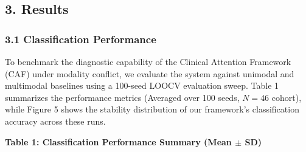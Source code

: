 \documentclass[
]{article}
\begin{document}
\subsection{\texorpdfstring{\textbf{3.
Results}}{3. Results}}\label{results}

\subsubsection{\texorpdfstring{\textbf{3.1 Classification
Performance}}{3.1 Classification Performance}}\label{classification-performance}

To benchmark the diagnostic capability of the Clinical Attention
Framework (CAF) under modality conflict, we evaluate the system against
unimodal and multimodal baselines using a 100-seed LOOCV evaluation
sweep. Table 1 summarizes the performance metrics (Averaged over 100
seeds, \(N = 46\) cohort), while Figure 5 shows the stability
distribution of our framework's classification accuracy across these
runs.

\textbf{Table 1: Classification Performance Summary (Mean \(\pm\) SD)}
\end{document}
